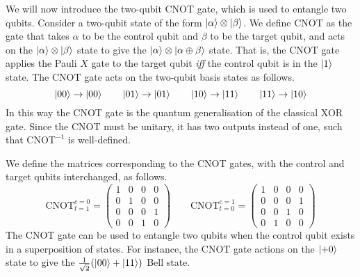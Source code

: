 We will now introduce the two-qubit CNOT gate, which is used to entangle two qubits. Consider a two-qubit state of the form $\ket \alpha \otimes \ket \beta$. We define CNOT as the gate that takes $\alpha$ to be the control qubit and $\beta$ to be the target qubit, and acts on the $\ket\alpha\otimes\ket\beta$ state to give the $\ket\alpha\otimes\ket{\alpha\oplus\beta}$ state. That is, the CNOT gate applies the Pauli $X$ gate to the target qubit \textit{iff} the control qubit is in the $\ket 1$ state. The CNOT gate acts on the two-qubit basis states as follows.
\begin{equation*}
    \ket{00} \rightarrow \ket {00} \qquad
    \ket{01} \rightarrow \ket {01} \qquad
    \ket{10} \rightarrow \ket {11} \qquad
    \ket{11} \rightarrow \ket {10}
\end{equation*}
In this way the CNOT gate is the quantum generalisation of the classical XOR gate. Since the CNOT must be unitary, it has two outputs instead of one, such that $\text{CNOT}^{-1}$ is well-defined.

We define the matrices corresponding to the CNOT gates, with the control and target qubits interchanged, as follows.
\begin{equation*}
\text{CNOT}^{c=0}_{t=1} =
    \begin{pmatrix}
        1 & 0 & 0 & 0 \\
        0 & 1 & 0 & 0 \\
        0 & 0 & 0 & 1 \\
        0 & 0 & 1 & 0
    \end{pmatrix} \qquad
    \text{CNOT}^{c=1}_{t=0} =
    \begin{pmatrix}
        1 & 0 & 0 & 0 \\
        0 & 0 & 0 & 1 \\
        0 & 0 & 1 & 0 \\
        0 & 1 & 0 & 0
    \end{pmatrix}
\end{equation*}\smallskip
The CNOT gate can be used to entangle two qubits when the control qubit exists in a superposition of states. For instance, the CNOT gate actions on the $\ket{+0}$ state to give the $\frac{1}{\sqrt 2} (\ket{00} + \ket{11})$ Bell state.
